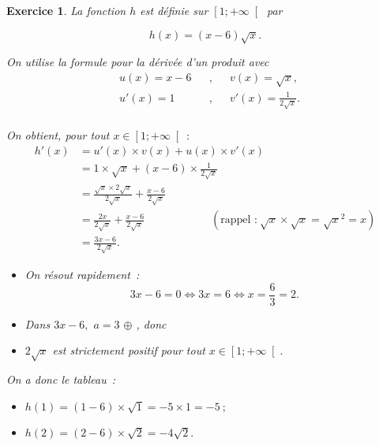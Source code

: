 \documentclass[10pt]{article}
\newtheorem{exo}{Exercice}
\begin{document}
\begin{exo}

La fonction $h$ est définie sur $\left[1;+\infty\right[$ par 

\[h(x)=(x-6)\sqrt{x}.\]
 
 
 On utilise la formule pour la dérivée d'un produit avec
\begin{align*}
&u(x)=x-6&&,&& v(x)=\sqrt{x}, \\
& u'(x)=1&&, &&v'(x)=\frac{1}{2\sqrt{x}}.\\
\end{align*}

On obtient, pour tout $x\in \left[1;+\infty\right[~:$
\begin{align*}h'(x)&=u'(x)\times v(x)+u(x)\times v'(x)\\&=1\times\sqrt{x}+(x-6)\times\frac{1}{2\sqrt{x}}\\&=\frac{\sqrt{x}\times 2\sqrt{x}}{2\sqrt{x}}+\frac{x-6}{2\sqrt{x}}\\&=\frac{2x}{2\sqrt{x}}+\frac{x-6}{2\sqrt{x}}\qquad\qquad\qquad\left(\text{rappel~:}~\sqrt{x}\times\sqrt{x}=\sqrt{x}^2=x\right)\\&=\frac{3x-6}{2\sqrt{x}}.\end{align*}

\medskip

\begin{itemize}
\item[\textbullet] On résout rapidement~:
\[3x-6=0\iff 3x=6\iff x=\frac{6}{3}=2.\]
\item[\textbullet] Dans $3x-6,$ $a=3$ $\oplus$ , donc \fbox{$-~\upphi~+$}
\item[\textbullet] $2\sqrt{x}$ est strictement positif pour tout $x\in \left[1;+\infty\right[.$
\end{itemize}

\medskip

On a donc le tableau~:

\medskip

\setlength{\columnseprule}{1pt}

\begin{multicols}{2}
\begin{center}
\end{center}

\columnbreak

\begin{itemize}
\item[\textbullet] $h(1)=(1-6)\times\sqrt{1}=-5\times 1=-5~;$
\item[\textbullet] $h(2)=(2-6)\times\sqrt{2}=-4\sqrt{2}.$
\end{itemize}

\end{multicols}

\end{exo}
\end{document}
